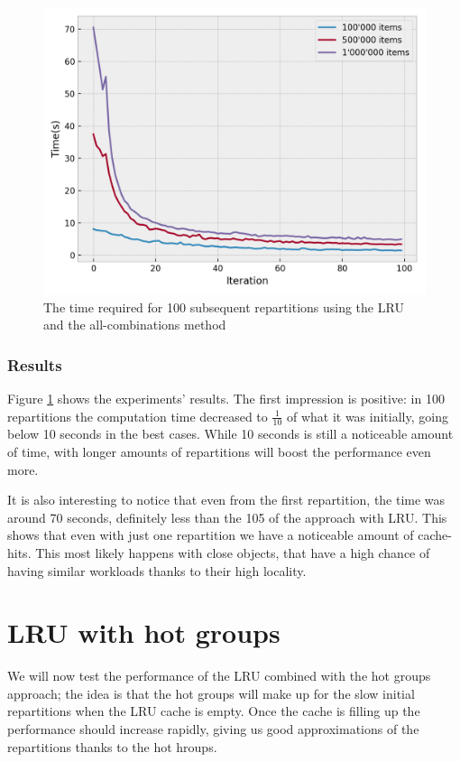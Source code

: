 \begin{figure}[!htb]
  \centering
  \includegraphics[width=\textwidth,height=\textheight,keepaspectratio]{img/LRU_8.png}
  \caption{The time required for 100 subsequent repartitions using the LRU and the all-combinations method }
  \label{fig:LRU_8}
\end{figure}

\subsubsection{Results}
Figure \ref{fig:LRU_8} shows the experiments' results. The first impression is positive: in 100 repartitions the computation time decreased to $\frac{1}{10}$ of what it was initially, going below 10 seconds in the best cases. While 10 seconds is still a noticeable amount of time, with longer amounts of repartitions will boost the performance even more. 

It is also interesting to notice that even from the first repartition, the time was around 70 seconds, definitely less than the 105 of the approach with LRU. This shows that even with just one repartition we have a noticeable amount of cache-hits. This most likely happens with close objects, that have a high chance of having similar workloads thanks to their high locality.

\section{LRU with hot groups}\label{sec:lru-hot-groups}
We will now test the performance of the LRU combined with the hot groups approach; the idea is that the hot groups will make up for the slow initial repartitions when the LRU cache is empty. Once the cache is filling up the performance should increase rapidly, giving us good approximations of the repartitions thanks to the hot hroups. 

